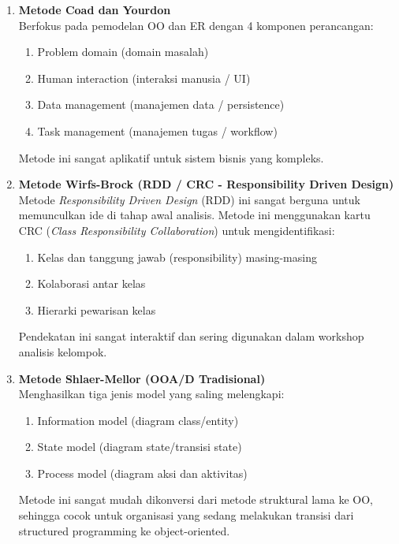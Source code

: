 \documentclass[12pt,a4paper]{article}
\begin{document}
\begin{enumerate}
    \item \textbf{Metode Coad dan Yourdon}\\
    Berfokus pada pemodelan OO dan ER dengan 4 komponen perancangan: 
    \begin{enumerate}[label=(\arabic*)]
        \item Problem domain (domain masalah)
        \item Human interaction (interaksi manusia / UI)
        \item Data management (manajemen data / persistence)
        \item Task management (manajemen tugas / workflow)
    \end{enumerate}
    Metode ini sangat aplikatif untuk sistem bisnis yang kompleks.
    
    \item \textbf{Metode Wirfs-Brock (RDD / CRC - Responsibility Driven Design)}\\
    Metode \textit{Responsibility Driven Design} (RDD) ini sangat berguna untuk memunculkan ide di tahap awal analisis. Metode ini menggunakan kartu CRC (\textit{Class Responsibility Collaboration}) untuk mengidentifikasi:
    \begin{enumerate}[label=(\arabic*)]
        \item Kelas dan tanggung jawab (responsibility) masing-masing
        \item Kolaborasi antar kelas
        \item Hierarki pewarisan kelas
    \end{enumerate}
    Pendekatan ini sangat interaktif dan sering digunakan dalam workshop analisis kelompok.
    
    \item \textbf{Metode Shlaer-Mellor (OOA/D Tradisional)}\\
    Menghasilkan tiga jenis model yang saling melengkapi:
    \begin{enumerate}[label=(\arabic*)]
        \item Information model (diagram class/entity)
        \item State model (diagram state/transisi state)
        \item Process model (diagram aksi dan aktivitas)
    \end{enumerate}
    Metode ini sangat mudah dikonversi dari metode struktural lama ke OO, sehingga cocok untuk organisasi yang sedang melakukan transisi dari structured programming ke object-oriented.
\end{enumerate}
\end{document}

